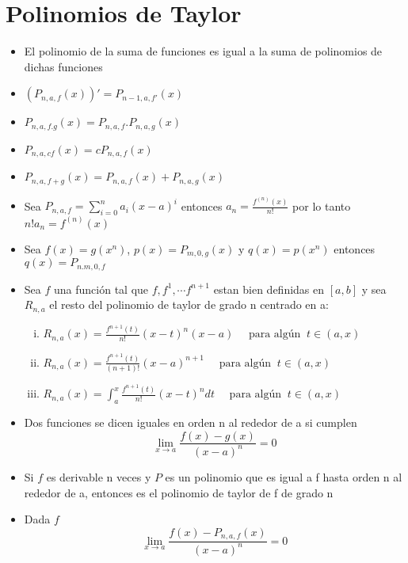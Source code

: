 \documentclass{article}
\theoremstyle{break}
\begin{document}
	\section{Polinomios de Taylor}
	\begin{itemize}
		\item El polinomio de la suma de funciones es igual a la suma de polinomios de dichas funciones
		\item $(P_{n,a,f}(x))'=P_{n-1,a,f'}(x)$
		\item $P_{n,a,f.g}(x)=P_{n,a,f}.P_{n,a,g}(x)$
		\item $P_{n,a,cf}(x)=cP_{n,a,f}(x)$
		\item $P_{n,a,f+g}(x)=P_{n,a,f}(x)+P_{n,a,g}(x)$
		\item Sea $P_{n,a,f}=\sum_{i=0}^{n}a_i(x-a)^i$ entonces $a_n=\frac{f^{(n)}(x)}{n!}$ por lo tanto $n!a_n=f^{(n)}(x)$
		\item Sea $f(x)=g(x^n)$, $p(x)=P_{m,0,g}(x)$ y $q(x)=p(x^n)$ entonces $q(x)=P_{n.m,0,f}$ 
		\item Sea $f$ una función tal que $f,f^1, \cdots f^{n+1}$ estan bien definidas en $[a,b] $ y sea $R_{n,a}$ el resto del polinomio de taylor
			de grado n centrado en a:
			\begin{enumerate}[(i)]
				\item $R_{n,a}(x) = \frac{f^{n+1}(t)}{n!}(x-t)^n(x-a) \quad \text{ para algún }\ t\in(a,x)$
				\item $R_{n,a}(x) = \frac{f^{n+1}(t)}{(n+1)!}(x-a)^{n+1} \quad \text{ para algún }\ t\in(a,x)$
				\item $R_{n,a}(x) =\int_{a}^{x}\frac{f^{n+1}(t)}{n!}(x-t)^n dt\quad \text{ para algún }\ t\in(a,x)$
			    
			\end{enumerate}
		\item Dos funciones se dicen iguales en orden n al rededor de a si cumplen
			\[\lim_{x\rightarrow a}\frac{f(x)-g(x)}{(x-a)^n}=0\]
		\item Si $f$ es derivable n veces y $P$ es un polinomio que es igual a f hasta orden n al rededor de a, entonces es el polinomio de taylor de f
			de grado n
		\item Dada $f$
			\[ \lim_{x\rightarrow a} \frac{f(x)-P_{n,a,f}(x)}{(x-a)^n} = 0\]
	\end{itemize}
\end{document}
